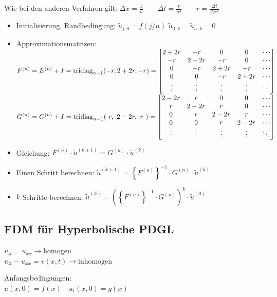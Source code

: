Wie bei den anderen Verfahren gilt: $\Delta x=\frac{1}{n} \qquad \Delta t=\frac{r}{n^2} \qquad \boxed{r=\frac{\Delta
t}{\Delta x^2}}$
\begin{itemize}
\item Initialisierung, Randbedingung: $\tilde{u}_{j,0}=f(j/n)$ \qquad $\tilde{u}_{0,k}=\tilde{u}_{n,k}=0$
\item Approximationsmatrizen:\\
$F^{(n)}=E^{(n)}+I=\operatorname{tridiag}_{n-1}(-r,2+2r,-r)=\begin{bmatrix}
2+2r& -r	& 0		& 0 	&\cdots\\
-r	& 2+2r  & -r	& 0		&\cdots\\
0	& -r	& 2+2r 	& -r 	&\cdots\\
0	& 0		& -r	& 2+2r 	&\cdots\\
\vdots&	\vdots&\vdots&\vdots&\ddots
\end{bmatrix}$\\
$G^{(n)}=C^{(n)}+I=\operatorname{tridiag}_{n-1}(~r,~2-2r,~r~)=\begin{bmatrix}
2-2r& r		& 0		& 0 	&\cdots\\
r	& 2-2r  & r		& 0		&\cdots\\
0	& r		& 2-2r 	& r 	&\cdots\\
0	& 0		& r		& 2-2r 	&\cdots\\
\vdots&	\vdots&\vdots&\vdots&\ddots
\end{bmatrix}$
\item Gleichung: $F^{(n)} \cdot \tilde{u}^{(k+1)}=G^{(n)} \cdot \tilde{u}^{(k)}$
\item Einen Schritt berechnen: $\tilde{u}^{(k+1)}=\left\{F^{(n)}\right\}^{-1} \cdot G^{(n)}\cdot \tilde{u}^{(k)}$
\item $k$-Schritte berechnen: $\tilde{u}^{(k)}=\left(\left\{F^{(n)}\right\}^{-1} \cdot G^{(n)}\right)^{k}\cdot \tilde{u}^{(0)}$
\end{itemize}

\subsection{FDM für Hyperbolische PDGL}

\begin{minipage}{8cm}
$u_{tt}=u_{xx} \rightarrow \text{homogen}$\\
$u_{tt} -u_{xx}= v(x,t) \rightarrow \text{inhomogen}$
\end{minipage}
\begin{minipage}{5cm}
Anfangsbedingungen:\\
$u(x,0)=f(x) \quad u_t(x,0)=g(x)$
\end{minipage}\\

